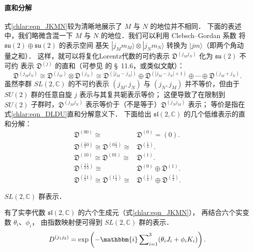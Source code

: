 \paragraph{直和分解}
式\eqref{chlar:eqn_JKMN}较为清晰地展示了 $M$ 与 $N$ 的地位并不相同．
下面的表述中，我们略微含混一下 $M$ 与 $N$ 的地位．我们可以利用 Clebsch--Gordan 系数
将 $\mathfrak{su}(2)\oplus\mathfrak{su}(2)$ 的表示空间
基矢 $|j_M m_M\rangle \otimes|j_N m_N\rangle$ 转换为 $|jm \rangle$（即两个角动量之和）．
这样，就可以将复化Lorentz代数的可约表示 $\mathfrak{D}^{(j_M j_N)}$ 化为 $\mathfrak{su}(2)$ 不可约
表示 $\mathfrak{D}^{(j)}$ 的直和（可参见 \parencite{taorb-2011-gt} 的 \S~11.6，或类似文献）：
\begin{equation}\label{chlar:eqn_DLDU}
	\mathfrak{D}^{(j_M j_N)} \cong \mathfrak{D}^{(j_M)}\otimes\mathfrak{D}^{(j_N)} \cong
	\mathfrak{D}^{(|j_M- j_N|)}\oplus \mathfrak{D}^{(|j_M- j_N|+1)}
	\oplus \cdots \oplus \mathfrak{D}^{(j_M+ j_N)}.
\end{equation}
虽然李群 $SL(2,\mathbb{C})$ 的不可约表示 $(j_M, j_N)$ 与 $(j_N, j_M)$ 并不等价，但由于 $SU(2)$ 群的任意自旋 $j$ 表示与其复共轭表示等价；
这便导致了在限制到 $SU(2)$ 子群时，$\mathfrak{D}^{(j_M j_N)}$ 表示{\fangsong 等价于}（不是{\kaishu 等于}）$\mathfrak{D}^{(j_N j_M)}$ 表示；
{\fangsong 等价}是指在式\eqref{chlar:eqn_DLDU}直和分解意义下．
下面给出 $\mathfrak{sl}(2,\mathbb{C})$ 的几个低维表示的直和分解：
\begin{align}
	\mathfrak{D}^{(00)} {\cong} &\mathfrak{D}^{(0)}= (0) . \label{chlar:eqn_D-scalar} \\
	\mathfrak{D}^{(\frac{1}{2}0)} \cong \mathfrak{D}^{(0\frac{1}{2})} {\cong}& \mathfrak{D}^{(\frac{1}{2})} . 
	\label{chlar:eqn_D-Weyl-Spinor} \\
	\mathfrak{D}^{(10)} \cong \mathfrak{D}^{(01)} {\cong}& \mathfrak{D}^{(1)} . \label{chlar:eqn_D0110}\\
	\mathfrak{D}^{(\frac{1}{2}\frac{1}{2})} {\cong} & \mathfrak{D}^{(0)}\oplus \mathfrak{D}^{(1)} . 
	\label{chlar:eqn_D-Vector} \\
	\mathfrak{D}^{(\frac{1}{2}1)} \cong \mathfrak{D}^{(1\frac{1}{2})} {\cong}&
	\mathfrak{D}^{(\frac{1}{2})}\oplus \mathfrak{D}^{(\frac{3}{2})} . 
\end{align}

\begin{example}
	$SL(2,\mathbb{C})$ 群表示．
\end{example}
有了实李代数 $\mathfrak{sl}(2,\mathbb{C})$ 的六个生成元（式\eqref{chlar:eqn_JKMN}），
再结合六个实变数 $\theta_i$、$\phi_i$，
由指数映射便可得到 $SL(2,\mathbb{C})$ 群的表示．
\begin{equation}\label{chlar:eqn_SL2-exp}
	D^{(j_1 j_2)}=\exp\left(-\mathbbm{i}\sum\nolimits_{i=1}^{3}(\theta_i J_i + \phi_i K_i)\right).
\end{equation}

